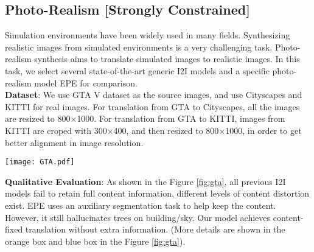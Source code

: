 \documentclass[runningheads]{llncs}
\begin{document}
\subsection{Photo-Realism [Strongly Constrained]}
\label{sim2real}
Simulation environments have been widely used in many fields. Synthesizing realistic images from simulated environments is a very challenging task. Photo-realism synthesis aims to translate simulated images to realistic images. In this task, we select several state-of-the-art generic I2I models and a specific photo-realism model EPE\cite{richter2021enhancing} for comparison.\\[1ex]
\noindent\textbf{Dataset}: 
We use GTA V dataset\cite{richter2016playing} as the source images, and use Cityscapes\cite{cordts2016cityscapes} and KITTI\cite{geiger2015kitti} for real images. For translation from GTA to Cityscapes, all the images are resized to 800$\times$1000. For translation from GTA to KITTI, images from KITTI are croped with 300$\times$400, and then resized to 800$\times$1000, in order to get better alignment in image resolution.\\[1ex]
\begin{figure*}
  \centering
  \texttt{[image: GTA.pdf]}
  \caption{Our results compared with several baselines. As shown in the \textcolor{orange}{orange} and \textcolor{blue}{blue} box, our method greatly preserves the content information. (a) Translation from GTA to Cityscapes. EPE\cite{richter2021enhancing}, CycleGAN\cite{engin2018cycle}, and CUT\cite{park2020contrastive} turn the color of the vehicle from white to black and generate trees in the sky. (b) Translation from GTA to KITTI. Both DRIT++\cite{lee2020drit++} and UNIT\cite{liu2017unsupervised} fail to keep the semantic information. MUNIT\cite{zhu2017multimodal} makes everything blurry.}
  \label{fig:gta}
\end{figure*}
\noindent\textbf{Qualitative Evaluation}: As shown in the Figure \ref{fig:gta}, all previous I2I models fail to retain full content information, different levels of content distortion exist. EPE uses an auxiliary segmentation task to help keep the content. However, it still hallucinates trees on building/sky. Our model achieves content-fixed translation without extra information. (More details are shown in the orange box and blue box in the Figure \ref{fig:gta}).\\[1ex]
\end{document}
